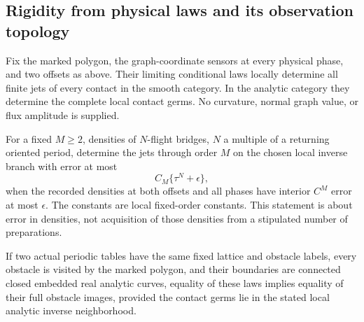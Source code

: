 \subsection{Rigidity from physical laws and its observation topology}

\begin{corollary}
\label{cor:v65-law-rigidity}
Fix the marked polygon, the graph-coordinate sensors at every physical
phase, and two offsets as above.  Their limiting conditional laws locally
determine all finite jets of every contact in the smooth category.
In the analytic category they determine the complete local contact germs.
No curvature, normal graph value, or flux amplitude is supplied.

For a fixed $M\ge2$, densities of $N$-flight bridges, $N$ a multiple
of a returning oriented period, determine the jets through order $M$
on the chosen local inverse branch with error at most
\begin{equation}\label{eq:v65-finite-flight-error}
 C_M\{\tau^N+\epsilon\},
\end{equation}
when the recorded densities at both offsets and all phases have interior
$C^M$ error at most $\epsilon$.  The constants are local fixed-order
constants.  This statement is about error in densities, not acquisition
of those densities from a stipulated number of preparations.

If two actual periodic tables have the same fixed lattice and obstacle
labels, every obstacle is visited by the marked polygon, and their
boundaries are connected closed embedded real analytic curves, equality
of these laws implies equality of their full obstacle images, provided
the contact germs lie in the stated local analytic inverse neighborhood.
\end{corollary}
